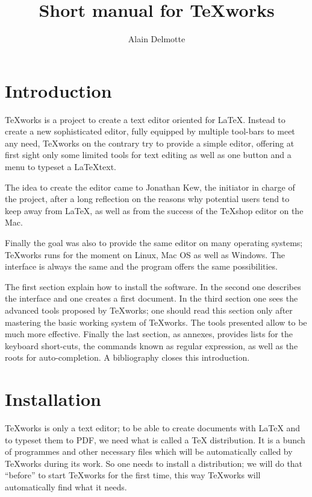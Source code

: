\documentclass[11pt]{article}
\title{Short manual for \TeX works}
\author{Alain Delmotte}
\begin{document}
\maketitle
\tableofcontents

\section{Introduction}

\TeX works is a project to create a text editor oriented for \LaTeX. Instead to create a new sophisticated editor, fully equipped by multiple tool-bars to meet any need, \TeX works on the contrary try to provide a simple editor, offering at first sight only some limited tools for text editing as well as one button and a menu to typeset a \LaTeX text.

The idea to create the editor came to Jonathan Kew, the initiator in charge of the project, after a long reflection on the reasons why potential users tend to keep away from \LaTeX, as well as from the success of the \TeX shop editor on the Mac.

Finally the goal was also to provide the same editor on many operating systems; \TeX works runs for the moment on Linux, Mac OS as well as Windows. The interface is always the same and the program offers the same possibilities.

The first section explain how to install the software. In the second one describes the interface and one creates a first document. In the third section one sees the advanced tools proposed by \TeX works; one should read this section only after mastering the basic working system of \TeX works. The tools presented allow to be much more effective. Finally the last section, as annexes, provides lists for the keyboard short-cuts, the commands known as regular expression, as well as the roots for auto-completion. A bibliography closes this introduction.

\section{Installation}
\label{insta}

\TeX works is only a text editor; to be able to create documents with \LaTeX{} and to typeset them to PDF, we need what is called a \TeX{} distribution. It is a bunch of programmes and other necessary files which will be automatically called by \TeX works during its work. So one needs to install a distribution; we will do that ``before'' to start \TeX works for the first time, this way \TeX works will automatically find what it needs.
\end{document}
